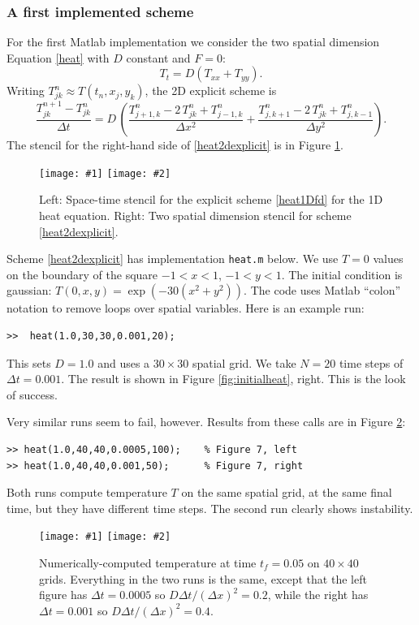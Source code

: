 \documentclass[titlepage,a4paper,final,12pt]{scrartcl}
\newcommand{\minput}[1]{
\bigskip
\begin{quote}
\bigskip
\VerbatimInput[frame=single,framesep=3mm,label=\fbox{\normalsize \textsl{\,#1.m\,}},fontfamily=courier,fontsize=\scriptsize]{../mfiles/#1.slim.m}
\bigskip
\end{quote}
}
\newcommand{\twofigsizes}[5]{
\begin{figure}[ht]
\centering
\texttt{[image: \#1]} \quad
\texttt{[image: \#2]}
\caption{#3}
\label{fig:#1}
\end{figure}}
\newcommand{\twofig}[3]{\twofigsizes{#1}{#2}{#3}{2.5in}{2.5in}}
\begin{document}
\subsubsection*{A first implemented scheme}  For the first Matlab implementation we consider the two spatial dimension Equation \eqref{heat} with $D$ constant and $F=0$:
\begin{equation}
T_t = D (T_{xx}+T_{yy}).\label{heat2D}
\end{equation}
Writing $T_{jk}^n \approx T(t_n,x_j,y_k)$, the 2D explicit scheme is
\begin{equation}
	\frac{T_{jk}^{n+1} - T_{jk}^n}{\Delta t} = D\,\left(\frac{T_{j+1,k}^n - 2\, T_{jk}^n + T_{j-1,k}^n}{\Delta x^2} + \frac{T_{j,k+1}^n - 2\, T_{jk}^n + T_{j,k-1}^n}{\Delta y^2}\right). \label{heat2dexplicit}
\end{equation}
The stencil for the right-hand side of \eqref{heat2dexplicit} is in Figure \ref{fig:expstencil}.

\twofigsizes{expstencil}{exp2dstencil}{Left: Space-time stencil for the explicit scheme \eqref{heat1Dfd} for the 1D heat equation.  Right: Two spatial dimension stencil for scheme \eqref{heat2dexplicit}.}{2.0in}{2.1in}

Scheme \eqref{heat2dexplicit} has implementation \texttt{heat.m} below.  We use $T=0$ values on the boundary of the square $-1 < x < 1$, $-1 < y < 1$.  The initial condition is gaussian: $T(0,x,y) = \exp(-30 (x^2+y^2))$.  The code uses Matlab ``colon'' notation to remove loops over spatial variables.  Here is an example run:
\begin{Verbatim}
>>  heat(1.0,30,30,0.001,20);
\end{Verbatim}
This sets $D=1.0$ and uses a $30\times 30$ spatial grid.  We take $N=20$ time steps of $\Delta t = 0.001$.  The result is shown in Figure \ref{fig:initialheat}, right.  This is the look of success.

\minput{heat}

Very similar runs seem to fail, however.  Results from these calls are in Figure \ref{fig:stability}:
\begin{Verbatim}
>> heat(1.0,40,40,0.0005,100);    % Figure 7, left
>> heat(1.0,40,40,0.001,50);      % Figure 7, right
\end{Verbatim}
Both runs compute temperature $T$ on the same spatial grid, at the same final time, but they have different time steps.  The second run clearly shows instability.

\twofig{stability}{instability}{Numerically-computed temperature at time $t_f=0.05$ on $40\times 40$ grids.  Everything in the two runs is the same, except that the left figure has $\Delta t=0.0005$ so $D\Delta t/(\Delta x)^2= 0.2$, while the right has $\Delta t=0.001$ so $D\Delta t/(\Delta x)^2= 0.4$.}
\end{document}
